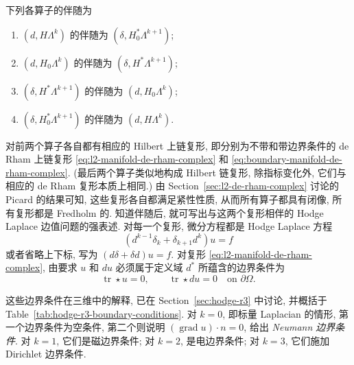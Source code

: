 \begin{Theorem}\label{thm:exterior-codifferential-adjoints}
下列各算子的伴随为
\begin{enumerate}
\item{$(d,H\Lambda^k)$ 的伴随为 $(\delta, H_{0}^*\Lambda^{k+1})$;}
\item{$(d, H_{0}\Lambda^k)$ 的伴随为 $(\delta,H^*\Lambda^{k+1})$;}
\item{$(\delta,H^*\Lambda^{k+1})$ 的伴随为 $(d, H_{0}\Lambda^k)$;}
\item{$(\delta, H_{0}^*\Lambda^{k+1})$ 的伴随为 $(d,H\Lambda^k)$.}
\end{enumerate}
\end{Theorem}

对前两个算子各自都有相应的 Hilbert 上链复形, 即分别为不带和带边界条件的 de Rham 上链复形 \eqref{eq:l2-manifold-de-rham-complex} 和 \eqref{eq:boundary-manifold-de-rham-complex}. (最后两个算子类似地构成 Hilbert 链复形, 除指标变化外, 它们与相应的 de Rham 复形本质上相同.) 由 Section~\ref{sec:l2-de-rham-complex} 讨论的 Picard 的结果可知, 这些复形各自都满足紧性性质, 从而所有算子都具有闭像, 所有复形都是 Fredholm 的. 知道伴随后, 就可写出与这两个复形相伴的 Hodge Laplace 边值问题的强表述. 对每一个复形, 微分方程都是 Hodge Laplace 方程
\[
(d^{k-1}\delta_k+\delta_{k+1}d^k)u=f
\]
或者省略上下标, 写为 $(d\delta+\delta d)u=f$. 对复形 \eqref{eq:l2-manifold-de-rham-complex}, 由要求 $u$ 和 $du$ 必须属于定义域 $d^*$ 所蕴含的边界条件为
\[
\operatorname{tr}\star u=0,\qquad\operatorname{tr}\star du=0\quad\text{on }\partial\Omega.
\]

这些边界条件在三维中的解释, 已在 Section~\ref{sec:hodge-r3} 中讨论, 并概括于 Table~\ref{tab:hodge-r3-boundary-conditions}. 对 $k=0$, 即标量 Laplacian 的情形, 第一个边界条件为空条件, 第二个则说明 $(\operatorname{grad}u)\cdot n=0$, 给出 \emph{Neumann 边界条件}. 对 $k=1$, 它们是磁边界条件; 对 $k=2$, 是电边界条件; 对 $k=3$, 它们施加 Dirichlet 边界条件.

